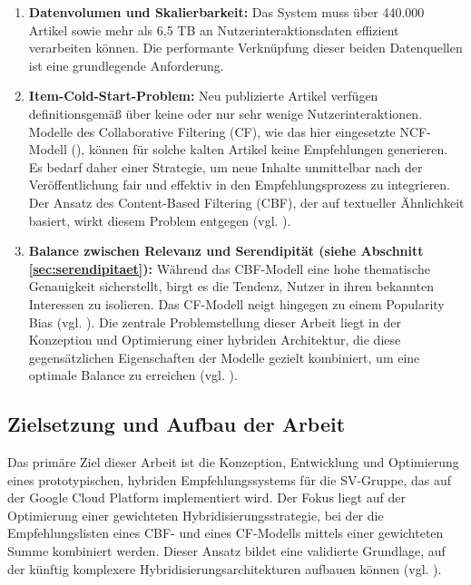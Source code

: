 \begin{enumerate}
    \item \textbf{Datenvolumen und Skalierbarkeit:} Das System muss über 440.000 Artikel sowie mehr als 6,5 TB 
    an Nutzerinteraktionsdaten effizient verarbeiten können. Die performante Verknüpfung dieser beiden Datenquellen 
    ist eine grundlegende Anforderung. %
    
    \item \textbf{Item-Cold-Start-Problem:} Neu publizierte Artikel verfügen definitionsgemäß über keine 
    oder nur sehr wenige Nutzerinteraktionen. Modelle des Collaborative Filtering (CF), wie das hier eingesetzte \ac{NCF}-Modell (\cite{he_neural_2017}), 
    können für solche kalten Artikel keine Empfehlungen generieren. Es bedarf daher einer Strategie, 
    um neue Inhalte unmittelbar nach der Veröffentlichung fair und effektiv in den Empfehlungsprozess zu integrieren. 
    Der Ansatz des Content-Based Filtering (CBF), der auf textueller Ähnlichkeit basiert, wirkt diesem Problem entgegen (vgl. \cite{Lops_CBRS_SOTA_2011}).
    
    \item \textbf{Balance zwischen Relevanz und Serendipität (siehe Abschnitt \ref{sec:serendipitaet}):} Während das CBF-Modell eine hohe thematische Genauigkeit 
    sicherstellt, birgt es die Tendenz, Nutzer in ihren bekannten Interessen zu isolieren. 
    Das CF-Modell neigt hingegen zu einem Popularity Bias (vgl. \cite{Abdollahpouri_Popularity_Bias_2019}). Die zentrale Problemstellung dieser Arbeit liegt in der 
    Konzeption und Optimierung einer hybriden Architektur, die diese gegensätzlichen Eigenschaften der Modelle gezielt 
    kombiniert, um eine optimale Balance zu erreichen (vgl. \cite{Kotkov_Serendipity_2016}).
\end{enumerate}

\subsection{Zielsetzung und Aufbau der Arbeit}
\label{sec:zielsetzung}
Das primäre Ziel dieser Arbeit ist die Konzeption, Entwicklung und Optimierung eines prototypischen, 
hybriden Empfehlungssystems für die \ac{SV-Gruppe}, das auf der Google Cloud Platform implementiert wird. %
Der Fokus liegt auf der Optimierung einer gewichteten Hybridisierungsstrategie, bei der die Empfehlungslisten 
eines \ac{CBF}- und eines \ac{CF}-Modells mittels einer gewichteten Summe 
kombiniert werden. Dieser Ansatz bildet eine validierte Grundlage, auf der künftig komplexere 
Hybridisierungsarchitekturen aufbauen können (vgl. \cite{burke_hybrid_2002}).

